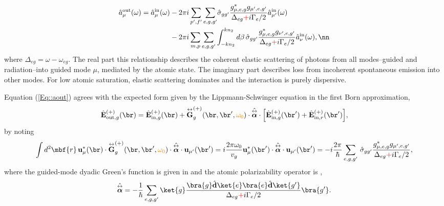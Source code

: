 \documentclass[]{report}
\newcommand{\tensor}[1]{\overset{\leftrightarrow}{#1}} %
\newcommand{\inp}{{\rm in}}
\newcommand{\out}{{\rm out}}
\newcommand{\poltens}{\hat{\tensor{\boldsymbol{\alpha}}}}
\newcommand{\comment}[1]{{\color{orange} #1}}
\newcommand{\error}[1]{{\color{red} #1}}
\begin{document}
\begin{align} \label{Eq::aout}
\hat{a}^{\out}_\mu (\omega) = \hat{a}^{\inp}_\mu (\omega) &- 2\pi i\sum_{p',f'} 
\sum_{e,g,g'}\!\hat{\sigma}_{gg'}\frac{ g_{\mu,e,g}^* g_{\mu',e,g'}}{ \Delta_{eg} \error{+} i \Gamma_{e}/2 }\hat{a}^{\inp}_{\mu'}(\omega) \\
&- 2\pi i\sum_{m,p} \sum_{e,g,g'} \int^{kn_2}_{-kn_2} d\beta \,\hat{\sigma}_{gg'}\frac{ g_{\mu,e,g}^* g_{\nu',e,g'}}{ \Delta_{eg} \error{+} i \Gamma_{e}/2 }\hat{a}^{\inp}_{\nu}(\omega),\nn
\end{align}
where $\Delta_{eg} = \omega - \omega_{eg}$.  The real part this relationship describes the coherent elastic scattering of photons from all modes--guided and radiation--into guided mode $\mu$, mediated by the atomic state.  The imaginary part describes loss from incoherent spontaneous emission into other modes.  For low atomic saturation, elastic scattering dominates and the interaction is purely dispersive. 

Equation (\ref{Eq::aout}) agrees with the expected form given by the Lippmann-Schwinger equation in the first Born approximation,
	\begin{equation} \label{Eq::IOScatteredField}
		\hat{\mathbf{E}}^{(+)}_{\out,g}(\br)=\hat{\mathbf{E}}^{(+)}_{ \inp, g}(\br)+\tensor{\mathbf{G}}_g^{(+)}(\br,\br',\comment{\omega_0})\cdot \poltens \cdot \Big[\hat{\mathbf{E}}^{(+)}_{\inp, g}(\br')+\hat{\mathbf{E}}^{(+)}_{\inp,r}(\br') \Big],
	\end{equation}
by noting
	\begin{equation}
		\int d^2 \mbf{r} \, \mathbf{u}^*_{\mu} (\br)\cdot \tensor{\mathbf{G}}_g^{(+)}(\br,\br',\comment{\omega_0})\cdot 
\poltens \cdot \mathbf{u}_{\mu'} (\br') =  i \frac{ 2\pi \omega_0}{v_g} \mathbf{u}^*_\mu 
 (\br') \cdot \poltens \cdot \mathbf{u}_{\mu'} (\br') = - i \frac{2 \pi}{\hbar} \sum_{e,g,g'}\!\ 
 \hat{\sigma}_{gg'} \frac{g_{\mu,e,g}^* g_{\mu',e,g'}}{ \Delta_{eg} \error{+} i \Gamma_{e}/2 }, 
	\end{equation}
where the guided-mode dyadic Green's function is given in  and the atomic polarizability operator is \cite{Buhmann2004, Deutsch2010a,LeKien2013a},
	\begin{equation} \label{Eq::PolarizabilityOperator}
		\poltens = - \frac{1}{\hbar} \sum_{e,g,g'}\ket{g}\frac{\bra{g}\hat{\mathbf{d}}\ket{e}\bra{e} 
\hat{\mathbf{d}}\ket{g'}}{\Delta_{eg}  \error{+} i \Gamma_{e}/2 }\bra{g'}.
	\end{equation}
	
\end{document}
